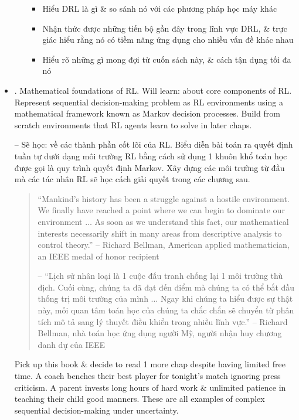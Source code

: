 \documentclass{article}
\begin{document}
\begin{itemize}
\begin{itemize}
        \begin{itemize}
            \item Hiểu DRL là gì \& so sánh nó với các phương pháp học máy khác
            \item Nhận thức được những tiến bộ gần đây trong lĩnh vực DRL, \& trực giác hiểu rằng nó có tiềm năng ứng dụng cho nhiều vấn đề khác nhau
            \item Hiểu rõ những gì mong đợi từ cuốn sách này, \& cách tận dụng tối đa nó
        \end{itemize}
    \end{itemize}
    \item {. Mathematical foundations of RL.} Will learn: about core components of RL. Represent sequential decision-making problem as RL environments using a mathematical framework known as Markov decision processes. Build from scratch environments that RL agents learn to solve in later chaps.

    -- Sẽ học: về các thành phần cốt lõi của RL. Biểu diễn bài toán ra quyết định tuần tự dưới dạng môi trường RL bằng cách sử dụng 1 khuôn khổ toán học được gọi là quy trình quyết định Markov. Xây dựng các môi trường từ đầu mà các tác nhân RL sẽ học cách giải quyết trong các chương sau.
    \begin{quote}
        ``Mankind's history has been a struggle against a hostile environment. We finally have reached a point where we can begin to dominate our environment $\ldots$ As soon as we understand this fact, our mathematical interests necessarily shift in many areas from descriptive analysis to control theory.'' -- {\sc Richard Bellman}, American applied mathematician, an IEEE medal of honor recipient

        -- ``Lịch sử nhân loại là 1 cuộc đấu tranh chống lại 1 môi trường thù địch. Cuối cùng, chúng ta đã đạt đến điểm mà chúng ta có thể bắt đầu thống trị môi trường của mình $\ldots$ Ngay khi chúng ta hiểu được sự thật này, mối quan tâm toán học của chúng ta chắc chắn sẽ chuyển từ phân tích mô tả sang lý thuyết điều khiển trong nhiều lĩnh vực.'' -- {\sc Richard Bellman}, nhà toán học ứng dụng người Mỹ, người nhận huy chương danh dự của IEEE
    \end{quote}
    Pick up this book \& decide to read 1 more chap despite having limited free time. A coach benches their best player for tonight's match ignoring press criticism. A parent invests long hours of hard work \& unlimited patience in teaching their child good manners. These are all examples of complex sequential decision-making under uncertainty.


\end{itemize}
\end{document}
